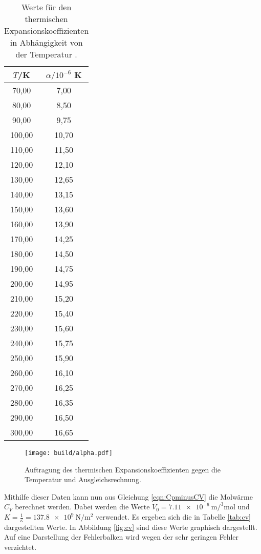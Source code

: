 \begin{table}[htp]
  \label{tab:alpha}
	\begin{center}
    \caption{Werte für den thermischen Expansionskoeffizienten \alpha in Abhängigkeit von der
    Temperatur \cite{versuchsanleitung}.}
		\begin{tabular}{cc}
		\toprule
			{$T$/K} & {$\alpha/10^{-6}$ K}\\
			\midrule
			70,00 & 7,00\\
			80,00 & 8,50\\
			90,00 & 9,75\\
			100,00 & 10,70\\
			110,00 & 11,50\\
			120,00 & 12,10\\
			130,00 & 12,65\\
			140,00 & 13,15\\
			150,00 & 13,60\\
			160,00 & 13,90\\
			170,00 & 14,25\\
			180,00 & 14,50\\
			190,00 & 14,75\\
			200,00 & 14,95\\
			210,00 & 15,20\\
			220,00 & 15,40\\
			230,00 & 15,60\\
			240,00 & 15,75\\
			250,00 & 15,90\\
			260,00 & 16,10\\
			270,00 & 16,25\\
			280,00 & 16,35\\
			290,00 & 16,50\\
			300,00 & 16,65\\
		\bottomrule
		\end{tabular}
	\end{center}
\end{table}

\begin{figure}
  \centering
  \texttt{[image: build/alpha.pdf]}
  \caption{Auftragung des thermischen Expansionskoeffizienten gegen die Temperatur und
  Ausgleichsrechnung.}
  \label{fig:alpha}
\end{figure}

Mithilfe dieser Daten kann nun aus Gleichung \eqref{eqn:CpminusCV} die Molwärme $C_V$
berechnet werden. Dabei werden die Werte $V_0=\SI{7.11e-6}{\metre\cubic\per\mol}$ und
$K=\frac{1}{\kappa}=\SI{137.8e9}{\newton\per\metre\squared}$ verwendet. Es ergeben sich die
in Tabelle \ref{tab:cv} dargestellten Werte. In Abbildung \ref{fig:cv} sind diese Werte
graphisch dargestellt. Auf eine Darstellung der Fehlerbalken wird wegen der sehr
geringen Fehler verzichtet.

